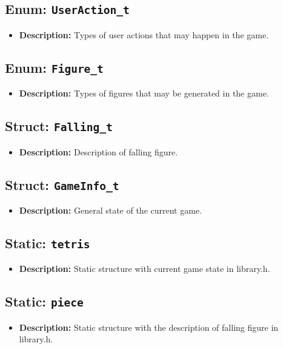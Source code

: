 \documentclass{article}
\begin{document}
\subsection{Enum: \texttt{UserAction\_t}}
\begin{itemize}
    \item \textbf{Description:} Types of user actions that may happen in the game.
\end{itemize}

\subsection{Enum: \texttt{Figure\_t}}
\begin{itemize}
    \item \textbf{Description:} Types of figures that may be generated in the game.
\end{itemize}

\subsection{Struct: \texttt{Falling\_t}}
\begin{itemize}
    \item \textbf{Description:} Description of falling figure.
\end{itemize}

\subsection{Struct: \texttt{GameInfo\_t}}
\begin{itemize}
    \item \textbf{Description:} General state of the current game.
\end{itemize}

\subsection{Static: \texttt{tetris}}
\begin{itemize}
    \item \textbf{Description:} Static structure with current game state in library.h.
\end{itemize}

\subsection{Static: \texttt{piece}}
\begin{itemize}
    \item \textbf{Description:} Static structure with the description of falling figure in library.h.
\end{itemize}
\end{document}

